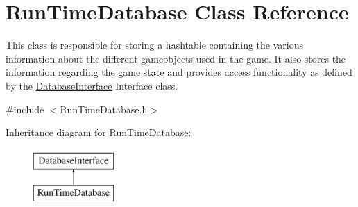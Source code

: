 \hypertarget{class_run_time_database}{}\section{Run\+Time\+Database Class Reference}
\label{class_run_time_database}


This class is responsible for storing a hashtable containing the various information about the different gameobjects used in the game. It also stores the information regarding the game state and provides access functionality as defined by the \hyperlink{class_database_interface}{Database\+Interface} Interface class.  




{\ttfamily \#include $<$Run\+Time\+Database.\+h$>$}

Inheritance diagram for Run\+Time\+Database\+:\begin{figure}[H]
\begin{center}
\leavevmode
\includegraphics[height=2.000000cm]{de/d2f/class_run_time_database}
\end{center}
\end{figure}

